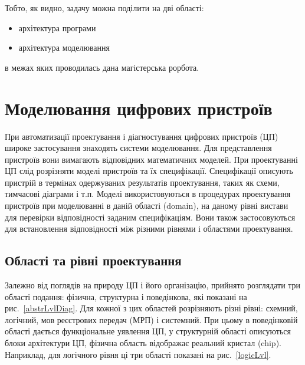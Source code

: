 \documentclass[12pt,a4paper]{article}
\begin{document}
Тобто, як видно, задачу можна поділити на дві області:
\begin{itemize}
  \item архітектура програми
  \item архітектура моделювання
\end{itemize}
в межах яких проводилась дана магістерська рорбота.

\clearpage


\section{Моделювання цифрових пристроїв}
При автоматизації проектування і діагностування цифрових пристроїв (ЦП) широке застосування знаходять системи моделювання. Для представлення пристроїв вони вимагають відповідних математичних моделей. При проектуванні ЦП слід розрізняти моделі пристроїв та їх специфікації. Специфікації описують пристрій в термінах одержуваних результатів проектування, таких як схеми, тимчасові діаграми і т.п. Моделі використовуються в процедурах проектування пристроїв при моделюванні в даній області (domain), на даному рівні вистави для перевірки відповідності заданим специфікаціям. Вони також застосовуються для встановлення відповідності між різними рівнями і областями проектування.

\subsection{Області та рівні проектування}
Залежно від поглядів на природу ЦП і його організацію, прийнято розглядати три області подання: фізична, структурна і поведінкова, які показані на рис.~\ref{abstrLvlDiag}. Для кожної з цих областей розрізняють різні рівні: схемний, логічний, мов реєстрових передач (МРП) і системний. При цьому в поведінковій області дається функціональне уявлення ЦП, у структурній області описуються блоки архітектури ЦП, фізична область відображає реальний кристал (chip). Наприклад, для логічного рівня ці три області показані на рис.~\ref{logicLvl}.
\end{document}
